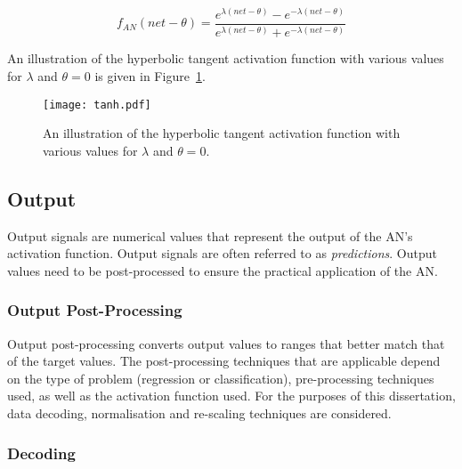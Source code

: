 \begin{equation}
      f_{AN}(net - \theta) = \frac{e^{\lambda(net - \theta)}-e^{-\lambda(net - \theta)}}{e^{\lambda(net - \theta)}+e^{-\lambda(net - \theta)}}
      \label{eq:hyperbolic_tangent}
\end{equation}

An illustration of the hyperbolic tangent activation function with various values for $\lambda$ and $\theta = 0$ is given in Figure~\ref{fig:anns:activation_functions:hyperbolic_tangent}.


\begin{figure}[htb]
      \centering
      \texttt{[image: tanh.pdf]}
      \caption[The hyperbolic tangent activation function]{An illustration of the hyperbolic tangent activation function with various values for $\lambda$ and $\theta = 0$.}
      \label{fig:anns:activation_functions:hyperbolic_tangent}
\end{figure}


\subsection{Output}\label{sec:anns:an:output}

Output signals are numerical values that represent the output of the \acs{AN}'s activation function. Output signals are often referred to as \textit{predictions}. Output values need to be post-processed to ensure the practical application of the \acs{AN}.

\subsubsection{Output Post-Processing}\label{sec:anns:an:output:output_post_processing}

Output post-processing converts output values to ranges that better match that of the target values. The post-processing techniques that are applicable depend on the type of problem (regression or classification), pre-processing techniques used, as well as the activation function used. For the purposes of this dissertation, data decoding, normalisation and
re-scaling techniques are considered.


\subsubsection{Decoding}\label{sec:anns:an:output:decoding}


